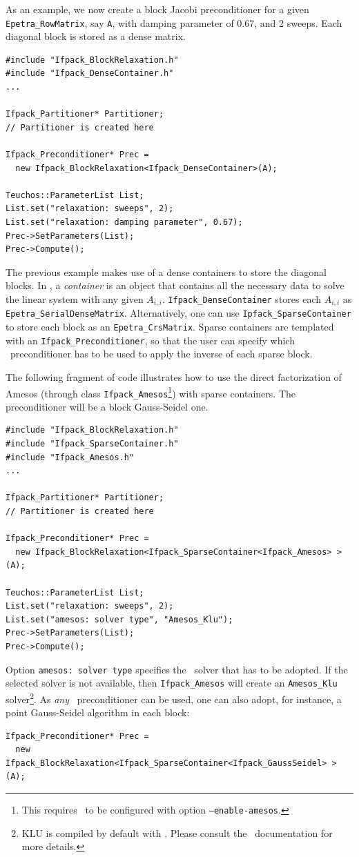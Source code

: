 As an example, we now create a block Jacobi preconditioner for 
a given \verb!Epetra_RowMatrix!, say \verb!A!,
with damping parameter of 0.67, and 2 sweeps. Each diagonal block is stored as a dense
matrix.

\begin{verbatim}
#include "Ifpack_BlockRelaxation.h"
#include "Ifpack_DenseContainer.h"
...

Ifpack_Partitioner* Partitioner;
// Partitioner is created here

Ifpack_Preconditioner* Prec =
  new Ifpack_BlockRelaxation<Ifpack_DenseContainer>(A);

Teuchos::ParameterList List;
List.set("relaxation: sweeps", 2);
List.set("relaxation: damping parameter", 0.67);
Prec->SetParameters(List);
Prec->Compute();
\end{verbatim}
The previous example makes use of a dense containers to store
the diagonal blocks.
In \ifpack, a {\sl container} is an object that contains all the necessary
data to solve the linear system with any given $A_{i,i}$. 
\verb!Ifpack_DenseContainer! stores each $A_{i,i}$ as
\verb!Epetra_SerialDenseMatrix!. Alternatively, one can use 
\verb!Ipfack_SparseContainer! to store each block as an
\verb!Epetra_CrsMatrix!. Sparse containers are templated with an
\verb!Ifpack_Preconditioner!, so that the user can specify which \ifpack\
  preconditioner has to be used to apply the inverse of each sparse block.

The following fragment of code illustrates how to use the direct factorization
of Amesos (through class \verb!Ifpack_Amesos!\footnote{This requires \ifpack\
	   to be configured with option {\tt --enable-amesos}.}) with sparse containers. The preconditioner will be a block Gauss-Seidel one.

\begin{verbatim}
#include "Ifpack_BlockRelaxation.h"
#include "Ifpack_SparseContainer.h"
#include "Ifpack_Amesos.h"
...

Ifpack_Partitioner* Partitioner;
// Partitioner is created here

Ifpack_Preconditioner* Prec =
  new Ifpack_BlockRelaxation<Ifpack_SparseContainer<Ifpack_Amesos> >(A);

Teuchos::ParameterList List;
List.set("relaxation: sweeps", 2);
List.set("amesos: solver type", "Amesos_Klu");
Prec->SetParameters(List);
Prec->Compute();
\end{verbatim}

Option \verb!amesos: solver type! specifies the \amesos\ solver that
has to be adopted. If the selected solver is not available, then
\verb!Ifpack_Amesos! will create an \verb!Amesos_Klu! solver\footnote{KLU is
  compiled by default with \amesos. Please consult the \amesos\ documentation
    for more details.}.
As {\sl any} \ifpack\ preconditioner can be used, one can also adopt, for
instance, a point Gauss-Seidel algorithm in each block:
\begin{verbatim}
Ifpack_Preconditioner* Prec =
  new Ifpack_BlockRelaxation<Ifpack_SparseContainer<Ifpack_GaussSeidel> >(A);
\end{verbatim}

